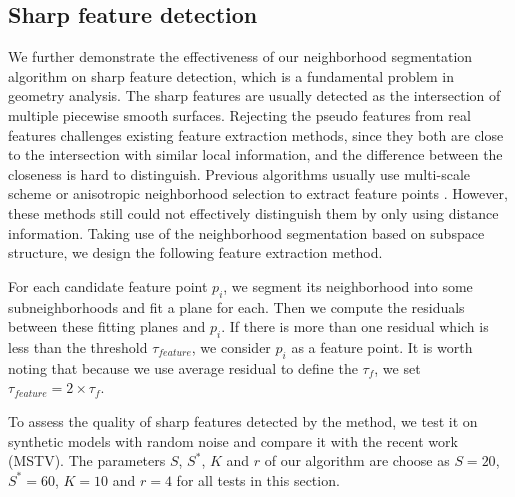 \subsection{Sharp feature detection}

We further demonstrate the effectiveness of our neighborhood segmentation algorithm on sharp feature detection, which is a fundamental problem in geometry analysis.
%
The sharp features are usually detected as the intersection of multiple piecewise smooth surfaces.
%
Rejecting the pseudo features from real features challenges existing feature extraction methods, since they both are close to the intersection with similar local information, and the difference between the closeness is hard to distinguish.
%
Previous algorithms usually use multi-scale scheme or anisotropic neighborhood selection to extract feature points \cite{PaulyKG03, DanielsHOS07, WeberHH10, ParkLL12}.
%
However, these methods still could not effectively distinguish them by only using distance information.
%
Taking use of the neighborhood segmentation based on subspace structure, we design the following feature extraction method.

%
For each candidate feature point $p_{i}$, we  segment its neighborhood into some subneighborhoods and fit a plane for each.
%
Then we compute the residuals between these fitting planes and $p_{i}$.
%
If there is more than one residual which is less than the threshold $\tau_{feature}$, we consider $p_{i}$ as a feature point.
%
It is worth noting that because we use average residual to define the $\tau_{f}$, we set $\tau_{feature} = 2 \times \tau_{f}$.


To assess the quality of sharp features detected by the method, we test it on synthetic models with random noise and compare it with the recent work~\cite{ParkLL12} (MSTV).
%
The parameters $S$, $S^{*}$, $K$ and $r$ of our algorithm are choose as $S=20$, $S^{*}=60$, $K=10$ and $r=4$ for all tests in this section.


